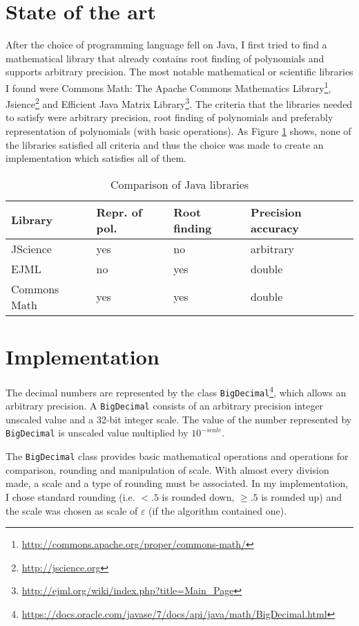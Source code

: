 \documentclass[
  digital, %
  notable,   %
  nolof,     %
  nolot,     %
	draft, %
]{fithesis3}
\begin{document}
\section{State of the art}
After the choice of programming language fell on Java, I first tried to find a mathematical library that already contains root finding of polynomials and supports arbitrary precision. The most notable mathematical or scientific libraries I found were Commons Math: The Apache Commons Mathematics Library\footnote{\url{http://commons.apache.org/proper/commons-math/}}, Jsience\footnote{\url{http://jscience.org}} and Efficient Java Matrix Library\footnote{\url{http://ejml.org/wiki/index.php?title=Main_Page}}. The criteria that the libraries needed to satisfy were arbitrary precision, root finding of polynomials and preferably representation of polynomials (with basic operations). As Figure \ref{tab:sota} shows, none of the libraries satisfied all criteria and thus the choice was made to create an implementation which satisfies all of them.

\FloatBarrier
\begin{table}[H]
  \begin{tabular*}{\textwidth}{llll}
    \toprule
    Library & Repr. of pol. & Root finding & Precision accuracy\\
    \midrule
				JScience & yes & no & arbitrary \\
				EJML & no & yes & double \\
				Commons Math & yes & yes & double \\
    \bottomrule
  \end{tabular*}
  \caption{Comparison of Java libraries}
  \label{tab:sota}
\end{table}

\section{Implementation}
The decimal numbers are represented by the class \texttt{BigDecimal}\footnote{\url{https://docs.oracle.com/javase/7/docs/api/java/math/BigDecimal.html}}, which allows an arbitrary precision. A \texttt{BigDecimal} consists of an arbitrary precision integer unscaled value and a 32-bit integer scale. The value of the number represented by \texttt{BigDecimal} is unscaled value multiplied by $10^{-scale}$.

The \texttt{BigDecimal} class provides basic mathematical operations and operations for comparison, rounding and manipulation of scale. With almost every division made, a scale and a type of rounding must be associated. In my implementation, I chose standard rounding (i.e. $<.5$ is rounded down, $\geq.5$ is rounded up) and the scale was chosen as scale of $\varepsilon$ (if the algorithm contained one).
\end{document}
